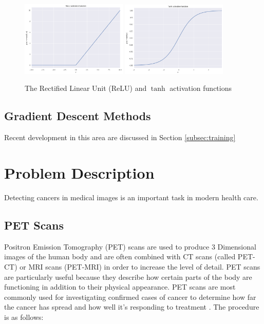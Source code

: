 \begin{figure}[hbtp!]
    \centering
    \includegraphics[width=0.45\textwidth]{./img/ReLU.png}
    \includegraphics[width=0.45\textwidth]{./img/tanh.png}
    \caption{The Rectified Linear Unit (ReLU) and $\tanh$ activation functions}
    \label{fig:ReLU_tanh}
\end{figure}

\subsection{Gradient Descent Methods}\label{subsec:gradient_descent}
Recent development in this area are discussed in Section \ref{subsec:training}


\section{Problem Description}\label{sec:problem_description_int}
Detecting cancers in medical images is an important task in modern health care.

\subsection{PET Scans}\label{subsec:pet_scan_int}
Positron Emission Tomography (PET) scans are used to produce 3 Dimensional images of the human body and are often combined with CT scans (called PET-CT) or MRI scans (PET-MRI) in order to increase the level of detail.
PET scans are particularly useful because they describe how certain parts of the body are functioning in addition to their physical appearance.
PET scans are most commonly used for investigating confirmed cases of cancer to determine how far the cancer has spread and how well it's responding to treatment \cite{Radiology_ACR, PET_scan}.
The procedure is as follows:

